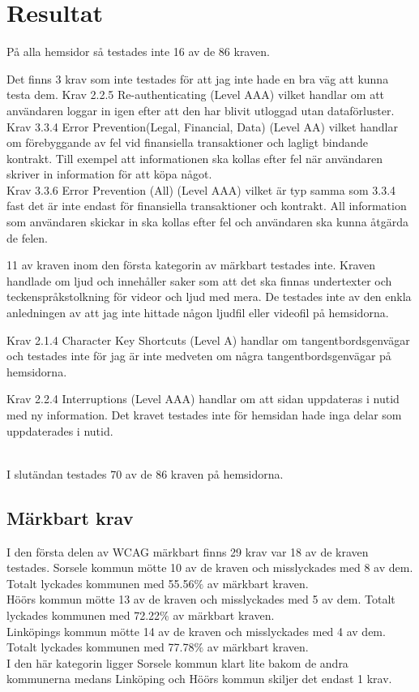 \documentclass[11p]{article}
\begin{document}
    \section{Resultat}

    På alla hemsidor så testades inte 16 av de 86 kraven.

    Det finns 3 krav som inte testades för att jag inte hade en bra väg att kunna testa dem.
    Krav 2.2.5 Re-authenticating (Level AAA) vilket handlar om att användaren loggar in igen efter att den har blivit utloggad utan dataförluster.
   \\ Krav 3.3.4 Error Prevention(Legal, Financial, Data) (Level AA) vilket handlar om förebyggande av fel vid finansiella transaktioner och lagligt bindande kontrakt.
    Till exempel att informationen ska kollas efter fel när användaren skriver in information för att köpa något.
  \\  Krav 3.3.6 Error Prevention (All) (Level AAA) vilket är typ samma som 3.3.4 fast det är inte endast för finansiella transaktioner och kontrakt.
    All information som användaren skickar in ska kollas efter fel och användaren ska kunna åtgärda de felen.

    11 av kraven inom den första kategorin av märkbart testades inte.
    Kraven handlade om ljud och innehåller saker som att det ska finnas undertexter och teckenspråkstolkning för videor och ljud med mera.
    De testades inte av den enkla anledningen av att jag inte hittade någon ljudfil eller videofil på hemsidorna.

    Krav 2.1.4 Character Key Shortcuts (Level A) handlar om tangentbordsgenvägar och testades inte för jag är inte medveten om några tangentbordsgenvägar på hemsidorna.

    Krav 2.2.4 Interruptions (Level AAA) handlar om att sidan uppdateras i nutid med ny information.
    Det kravet testades inte för hemsidan hade inga delar som uppdaterades i nutid.

  \\  I slutändan testades 70 av de 86 kraven på hemsidorna.

    \subsection{Märkbart krav}
    I den första delen av WCAG märkbart finns 29 krav var 18 av de kraven testades.
    Sorsele kommun mötte 10 av de kraven och misslyckades med 8 av dem.
    Totalt lyckades kommunen med 55.56$\%$ av märkbart kraven.
    \\Höörs kommun mötte 13 av de kraven och misslyckades med 5 av dem.
    Totalt lyckades kommunen med 72.22$\%$ av märkbart kraven.
    \\Linköpings kommun mötte 14 av de kraven och misslyckades med 4 av dem.
    Totalt lyckades kommunen med 77.78$\%$ av märkbart kraven.
    \\I den här kategorin ligger Sorsele kommun klart lite bakom de andra kommunerna medans Linköping och Höörs kommun skiljer det endast 1 krav.
\end{document}
